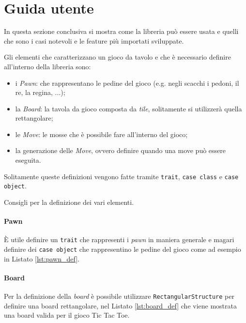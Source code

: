 \section{Guida utente}
%
In questa sezione conclusiva si mostra come la libreria può essere usata e quelli che sono i casi notevoli e le feature più importati sviluppate.

Gli elementi che caratterizzano un gioco da tavolo e che è necessario definire all'interno della libreria sono:
\begin{itemize}
  \item i \textit{Pawn}: che rappresentano le pedine del gioco (e.g. negli scacchi i pedoni, il re, la regina, ...);
  \item la \textit{Board}: la tavola da gioco composta da \textit{tile}, solitamente si utilizzerà quella rettangolare;
  \item le \textit{Move}: le mosse che è possibile fare all'interno del gioco;
  \item la generazione delle \textit{Move}, ovvero definire quando una move può essere eseguita.
\end{itemize}
%
Solitamente queste definizioni vengono fatte tramite \texttt{trait}, \texttt{case class} e \texttt{case object}.

Consigli per la definizione dei vari elementi.
\paragraph{Pawn}
%
È utile definire un \texttt{trait} che rappresenti i \textit{pawn} in maniera generale e magari definire dei \texttt{case object} che rappresentino le pedine del gioco come ad esempio in Listato \ref{lst:pawn_def}.


\paragraph{Board}
%
Per la definizione della \textit{board} è possibile utilizzare \texttt{RectangularStructure} per definire una board rettangolare, nel Listato \ref{lst:board_def} che viene mostrata una board valida per il gioco Tic Tac Toe.
%



